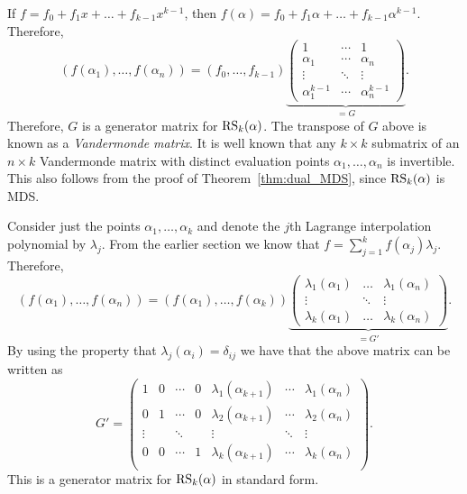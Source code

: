 \documentclass[../main.tex]{subfiles}
\begin{document}
If $f = f_0 + f_1x + \dots + f_{k-1} x^{k-1}$, then $f(\alpha) = f_0 + f_1\alpha + \dots + f_{k-1} \alpha^{k-1}$. Therefore,
\begin{equation*}
    (f(\alpha_1), \dots, f(\alpha_n)) = (f_0, \dots, f_{k-1}) \underbrace{\begin{pmatrix}
        1 & \cdots & 1 \\
        \alpha_1 & \cdots & \alpha_n \\
        \vdots & \ddots & \vdots \\
        \alpha_1^{k-1} & \cdots & \alpha_n^{k-1}
    \end{pmatrix}}_{=G}.
\end{equation*}
Therefore, $G$ is a generator matrix for $\operatorname{RS}_k(\alpha)$. The transpose of $G$ above is known as a \emph{Vandermonde matrix}. It is well known that any $k \times k$ submatrix of an $n \times k$ Vandermonde matrix with distinct evaluation points $\alpha_1, \dots, \alpha_n$ is invertible. This also follows from the proof of Theorem~\ref{thm:dual_MDS}, since $\operatorname{RS}_k(\alpha)$ is MDS.

Consider just the points $\alpha_1, \dots, \alpha_k$ and denote the $j$th Lagrange interpolation polynomial by $\lambda_j$. From the earlier section we know that $f = \sum_{j=1}^k f(\alpha_j) \lambda_j$. Therefore,
\begin{equation*}
    (f(\alpha_1), \dots, f(\alpha_n)) = (f(\alpha_1), \dots, f(\alpha_k)) \underbrace{\begin{pmatrix}
        \lambda_1(\alpha_1) & \dots & \lambda_1(\alpha_n) \\
        \vdots & \ddots & \vdots \\
        \lambda_k(\alpha_1) & \dots & \lambda_k(\alpha_n)
    \end{pmatrix}}_{=G'}.
\end{equation*}
By using the property that $\lambda_j(\alpha_i) = \delta_{ij}$ we have that the above matrix can be written as
\begin{equation*}
    G' =
    \begin{pmatrix}
        1 & 0 & \cdots & 0 & \lambda_1(\alpha_{k+1}) & \cdots & \lambda_1(\alpha_n) \\
        0 & 1 & \cdots & 0 & \lambda_2(\alpha_{k+1}) & \cdots & \lambda_2(\alpha_n) \\
        \vdots & & \ddots & & \vdots & \ddots & \vdots \\
        0 & 0 & \cdots & 1 & \lambda_k(\alpha_{k+1}) & \cdots & \lambda_k(\alpha_n) \\
    \end{pmatrix}.
\end{equation*}
This is a generator matrix for $\operatorname{RS}_k(\alpha)$ in standard form.
\end{document}
